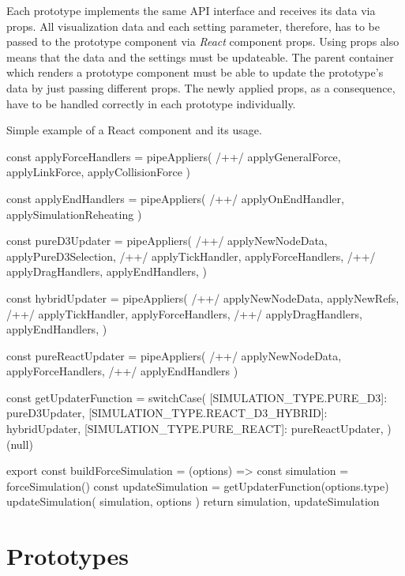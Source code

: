 Each prototype implements the same API interface and receives its data via props. All visualization data and each setting parameter, therefore, has to be passed to the prototype component via \emph{React} component props. Using props also means that the data and the settings must be updateable. The parent container which renders a prototype component must be able to update the prototype's data by just passing different props. The newly applied props, as a consequence, have to be handled correctly in each prototype individually.

\begin{program}[H]
\caption{Simple example of a React component and its usage.} 
\label{prog:forceBuildModule}
\begin{JsCode}
const applyForceHandlers = pipeAppliers( /+\label{line:composition1}+/
  applyGeneralForce, 
  applyLinkForce, 
  applyCollisionForce
)

const applyEndHandlers = pipeAppliers( /+\label{line:composition2}+/
  applyOnEndHandler, 
  applySimulationReheating
)

const pureD3Updater = pipeAppliers( /+\label{line:updater1}+/
  applyNewNodeData,
  applyPureD3Selection, /+\label{line:applyPureD3Selection}+/
  applyTickHandler,
  applyForceHandlers, /+\label{line:applyForce1}+/
  applyDragHandlers,
  applyEndHandlers,
)

const hybridUpdater = pipeAppliers( /+\label{line:updater2}+/
  applyNewNodeData,
  applyNewRefs, /+\label{line:applyNewRefs}+/
  applyTickHandler,
  applyForceHandlers, /+\label{line:applyForce2}+/
  applyDragHandlers,
  applyEndHandlers,
)

const pureReactUpdater = pipeAppliers( /+\label{line:updater3}+/
  applyNewNodeData, 
  applyForceHandlers, /+\label{line:applyForce3}+/
  applyEndHandlers
)

const getUpdaterFunction = switchCase({
  [SIMULATION_TYPE.PURE_D3]: pureD3Updater,
  [SIMULATION_TYPE.REACT_D3_HYBRID]: hybridUpdater,
  [SIMULATION_TYPE.PURE_REACT]: pureReactUpdater,
})(null)

export const buildForceSimulation = (options) => {
  const simulation = forceSimulation()
  const updateSimulation = getUpdaterFunction(options.type)
  updateSimulation({ simulation, options })
  return { simulation, updateSimulation }
}
\end{JsCode}
\end{program}


\section{Prototypes}

